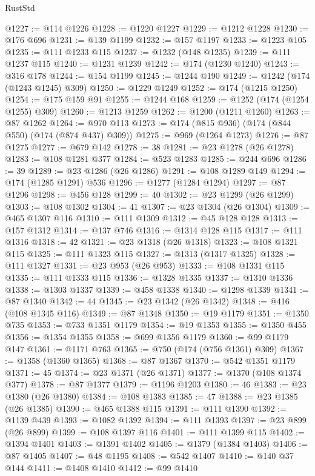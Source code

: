 \begin{lexlean}{RustStd}
\begin{coremodule}
@1227 := @114 @1226
@1228 := @1220 @1227
@1229 := @1212 @1228
@1230 := @176 @696
@1231 := @139 @1199
@1232 := @157 @1197
@1233 := @1223 @105
@1235 := @111 @1233 @115
@1237 := @1232 (@148 @1235)
@1239 := @111 @1237 @115
@1240 := @1231 @1239
@1242 := @174 (@1230 @1240)
@1243 := @316 @178
@1244 := @154 @1199
@1245 := @1244 @190
@1249 := @1242 (@174 (@1243 @1245) @309)
@1250 := @1229 @1249
@1252 := @174 (@1215 @1250)
@1254 := @175 @159 @91
@1255 := @1244 @168
@1259 := @1252 (@174 (@1254 @1255) @309)
@1260 := @1213 @1259
@1262 := @1200 (@1211 @1260)
@1263 := @87 @1262
@1264 := @970 @113
@1273 := @174 (@815 @936) (@174 (@844 @550) (@174 (@874 @437) @309))
@1275 := @969 (@1264 @1273)
@1276 := @87 @1275
@1277 := @679 @142
@1278 := 38
@1281 := @23 @1278 (@26 @1278)
@1283 := @108 @1281 @377
@1284 := @523 @1283
@1285 := @244 @696
@1286 := 39
@1289 := @23 @1286 (@26 @1286)
@1291 := @108 @1289 @149
@1294 := @174 (@1285 @1291) @536
@1296 := @1277 (@1284 @1294)
@1297 := @87 @1296
@1298 := @456 @128
@1299 := 40
@1302 := @23 @1299 (@26 @1299)
@1303 := @108 @1302
@1304 := 41
@1307 := @23 @1304 (@26 @1304)
@1309 := @465 @1307 @116
@1310 := @111 @1309
@1312 := @45 @128 @128
@1313 := @157 @1312
@1314 := @137 @746
@1316 := @1314 @128 @115
@1317 := @111 @1316
@1318 := 42
@1321 := @23 @1318 (@26 @1318)
@1323 := @108 @1321 @115
@1325 := @111 @1323 @115
@1327 := @1313 (@1317 @1325)
@1328 := @111 @1327
@1331 := @23 @953 (@26 @953)
@1333 := @108 @1331 @115
@1335 := @111 @1333 @115
@1336 := @1328 @1335
@1337 := @1310 @1336
@1338 := @1303 @1337
@1339 := @458 @1338
@1340 := @1298 @1339
@1341 := @87 @1340
@1342 := 44
@1345 := @23 @1342 (@26 @1342)
@1348 := @416 (@108 @1345 @116)
@1349 := @87 @1348
@1350 := @19 @1179
@1351 := @1350 @735
@1353 := @733 @1351 @1179
@1354 := @19 @1353
@1355 := @1350 @455
@1356 := @1354 @1355
@1358 := @699 @1356 @1179
@1360 := @99 @1179 @147
@1361 := @1171 @763
@1365 := @750 (@174 (@756 @1361) @309)
@1367 := @1358 (@1360 @1365)
@1368 := @87 @1367
@1370 := @542 @1351 @1179
@1371 := 45
@1374 := @23 @1371 (@26 @1371)
@1377 := @1370 (@108 @1374 @377)
@1378 := @87 @1377
@1379 := @1196 @1203
@1380 := 46
@1383 := @23 @1380 (@26 @1380)
@1384 := @108 @1383
@1385 := 47
@1388 := @23 @1385 (@26 @1385)
@1390 := @465 @1388 @115
@1391 := @111 @1390
@1392 := @1139 @439
@1393 := @1082 @1392
@1394 := @111 @1393
@1397 := @23 @899 (@26 @899)
@1399 := @108 @1397 @116
@1401 := @111 @1399 @115
@1402 := @1394 @1401
@1403 := @1391 @1402
@1405 := @1379 (@1384 @1403)
@1406 := @87 @1405
@1407 := @48 @1195
@1408 := @542 @1407
@1410 := @140 @37 @144
@1411 := @1408 @1410
@1412 := @99 @1410

\end{coremodule}
\end{lexlean}

